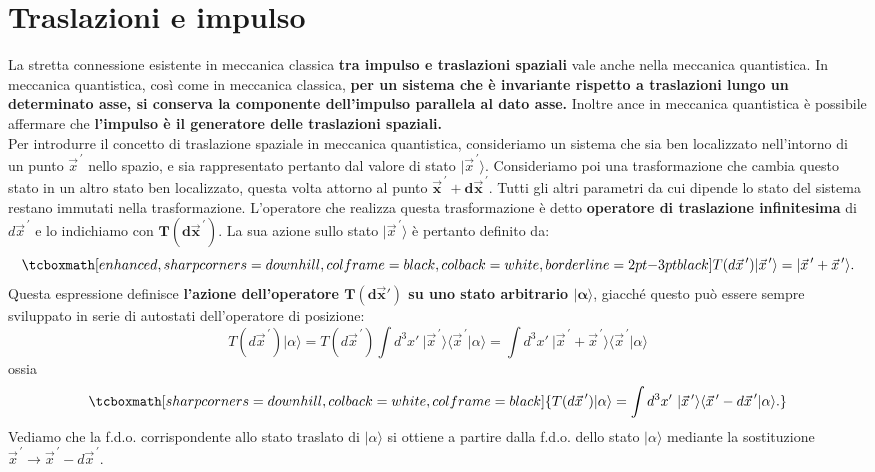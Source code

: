 \chapter[Traslazioni e impulso]{Traslazioni e impulso}
La stretta connessione esistente in meccanica classica \textbf{tra impulso e traslazioni spaziali} vale anche nella meccanica quantistica. In meccanica quantistica, così come in meccanica classica, \textbf{per un sistema che è invariante rispetto a traslazioni lungo un determinato asse, si conserva la componente dell'impulso parallela al dato asse.} Inoltre ance in meccanica quantistica è possibile affermare che \textbf{l'impulso è il generatore delle traslazioni spaziali.}\\

Per introdurre il concetto di traslazione spaziale in meccanica quantistica, consideriamo un sistema che sia ben localizzato nell'intorno di un punto ${\vec{x}}^{\, \prime}$ nello spazio, e sia rappresentato pertanto dal valore di stato $\vert {\vec{x}}^{\, \prime} \rangle$. Consideriamo poi una trasformazione che cambia questo stato in un altro stato ben localizzato, questa volta attorno al punto $\mathbf{{\vec{x}}^{\, \prime} + d{\vec{x}}^{\, \prime}}$. Tutti gli altri parametri da cui dipende lo stato del sistema restano immutati nella trasformazione. L'operatore che realizza questa trasformazione è detto \textbf{operatore di traslazione infinitesima} di $d{\vec{x}}^{\, \prime}$ e lo indichiamo con $\mathbf{T(d{\vec{x}}^{\, \prime})}$. La sua azione sullo stato
 $\vert {\vec{x}}^{\, \prime} \rangle$ è pertanto definito da:
	\begin{equation}
		\tcboxmath[enhanced, sharp corners=downhill, colframe=black, colback=white, borderline={2pt}{-3pt}{black}]{
			T(d{\vec{x}}^{\, \prime})\vert {\vec{x}}^{\, \prime} \rangle=\vert {\vec{x}}^{\, \prime}+ {\vec{x}}^{\, \prime} \rangle .
			}
	\end{equation}
Questa espressione definisce \textbf{l'azione dell'operatore $\mathbf{T(d\vec{x}')}$ su uno stato arbitrario $\mathbf{\vert \alpha \rangle}$}, giacché questo può essere sempre sviluppato in serie di autostati dell'operatore di posizione:
	\begin{equation}
		T({d\vec{x}}^{\, \prime}) \vert \alpha \rangle = T(d{\vec{x}}^{\, \prime}) \int d^3x' \ \vert {\vec{x}}^{\, \prime} \rangle \langle {\vec{x}}^{\, \prime} \vert \alpha \rangle =   \int d^3x' \ {\vert \vec{x}}^{\, \prime} + {\vec{x}}^{\, \prime} \rangle \langle {\vec{x}}^{\, \prime} \vert \alpha \rangle 
	\end{equation}
ossia
	\begin{equation}
		\tcboxmath[sharp corners=downhill, colback=white, colframe=black]{
			T({d\vec{x}}^{\, \prime}) \vert \alpha \rangle  = \int d^3x' \ \vert {\vec{x}}^{\, \prime}  \rangle \langle {\vec{x}}^{\, \prime} - {d\vec{x}}^{\, \prime} \vert \alpha \rangle .
			}
	\end{equation}
Vediamo che la f.d.o. corrispondente allo stato traslato di $\vert \alpha \rangle $ si ottiene a partire dalla f.d.o. dello stato $\vert \alpha \rangle $ mediante la sostituzione ${\vec{x}}^{\, \prime} \rightarrow {\vec{x}}^{\, \prime}-d{\vec{x}}^{\, \prime}$.\\

